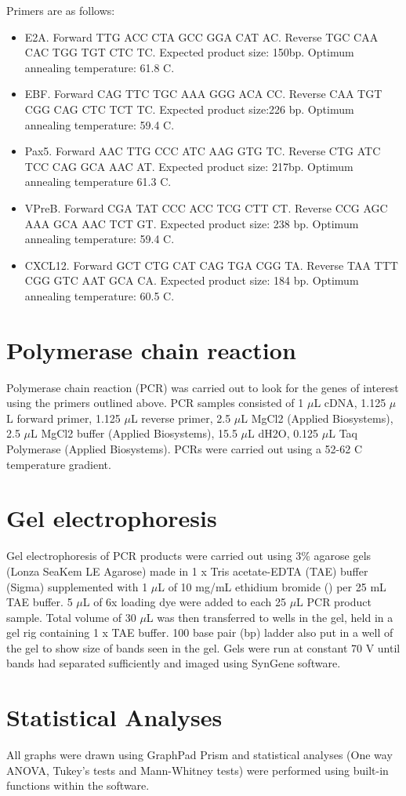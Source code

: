 Primers are as follows:
\begin{itemize}
\item E2A. Forward TTG ACC CTA GCC GGA CAT AC.
Reverse TGC CAA CAC TGG TGT CTC TC.
Expected product size: 150bp.
Optimum annealing temperature: 61.8 \textdegree C.

\item EBF.
Forward CAG TTC TGC AAA GGG ACA CC.
Reverse CAA TGT CGG CAG CTC TCT TC.
Expected product size:226 bp.
Optimum annealing temperature: 59.4 \textdegree C.

\item Pax5. Forward AAC TTG CCC ATC AAG GTG TC.
Reverse CTG ATC TCC CAG GCA AAC AT.
Expected product size: 217bp.
Optimum annealing temperature 61.3 \textdegree C.

\item VPreB.
Forward CGA TAT CCC ACC TCG CTT CT.
Reverse CCG AGC AAA GCA AAC TCT GT.
Expected product size: 238 bp.
Optimum annealing temperature: 59.4 \textdegree C.

\item CXCL12.
Forward GCT CTG CAT CAG TGA CGG TA.
Reverse TAA TTT CGG GTC AAT GCA CA.
Expected product size: 184 bp.
Optimum annealing temperature: 60.5 \textdegree C.
\end{itemize}

\section{Polymerase chain reaction}

Polymerase chain reaction (PCR) was carried out to look for the genes of interest using the primers outlined above.
PCR samples consisted of 1 $\mu$L cDNA, 1.125 $\mu$L forward primer, 1.125 $\mu$L reverse primer, 2.5 $\mu$L MgCl{2} (Applied Biosystems), 2.5 $\mu$L MgCl{2} buffer (Applied Biosystems), 15.5 $\mu$L dH{2}O, 0.125 $\mu$L Taq Polymerase (Applied Biosystems).
PCRs were carried out using a 52-62 \textdegree C temperature gradient.

\section{Gel electrophoresis}

Gel electrophoresis of PCR products were carried out using 3\% agarose gels (Lonza SeaKem LE Agarose) made in 1 x Tris acetate-EDTA (TAE) buffer (Sigma) supplemented with 1 $\mu$L of 10 mg/mL ethidium bromide () per 25 mL TAE buffer.
5 $\mu$L of 6x loading dye  were added to each 25 $\mu$L PCR product sample.
Total volume of 30 $\mu$L was then transferred to wells in the gel, held in a gel rig containing 1 x TAE buffer.
100 base pair (bp) ladder also put in a well of the gel to show size of bands seen in the gel.
Gels were run at constant 70 V until bands had separated sufficiently and imaged using SynGene software.

\section{Statistical Analyses}

All graphs were drawn using GraphPad Prism and statistical analyses (One way ANOVA, Tukey's tests and Mann-Whitney tests) were performed using built-in functions within the software.
